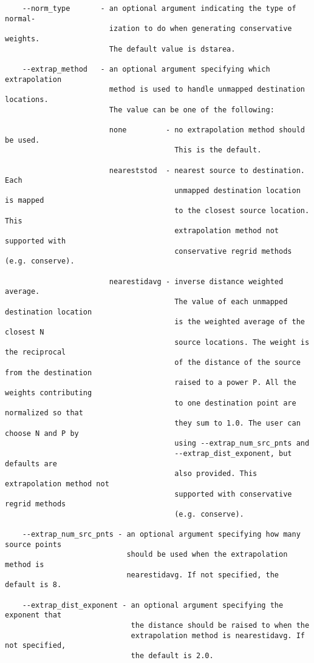 \begin{verbatim}
    --norm_type       - an optional argument indicating the type of normal-
                        ization to do when generating conservative weights. 
                        The default value is dstarea.

    --extrap_method   - an optional argument specifying which extrapolation
                        method is used to handle unmapped destination locations.
                        The value can be one of the following:

                        none         - no extrapolation method should be used.
                                       This is the default. 

                        neareststod  - nearest source to destination. Each
                                       unmapped destination location is mapped 
                                       to the closest source location. This 
                                       extrapolation method not supported with 
                                       conservative regrid methods (e.g. conserve).
        
                        nearestidavg - inverse distance weighted average. 
                                       The value of each unmapped destination location
                                       is the weighted average of the closest N 
                                       source locations. The weight is the reciprocal 
                                       of the distance of the source from the destination
                                       raised to a power P. All the weights contributing 
                                       to one destination point are normalized so that 
                                       they sum to 1.0. The user can choose N and P by
                                       using --extrap_num_src_pnts and 
                                       --extrap_dist_exponent, but defaults are 
                                       also provided. This extrapolation method not 
                                       supported with conservative regrid methods
                                       (e.g. conserve).

    --extrap_num_src_pnts - an optional argument specifying how many source points
                            should be used when the extrapolation method is 
                            nearestidavg. If not specified, the default is 8.

    --extrap_dist_exponent - an optional argument specifying the exponent that 
                             the distance should be raised to when the 
                             extrapolation method is nearestidavg. If not specified, 
                             the default is 2.0.


\end{verbatim}
